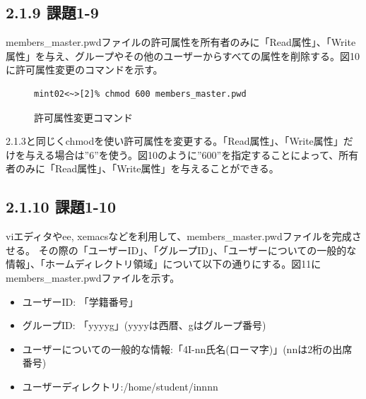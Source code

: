 \documentclass[12pt]{jreport}
\begin{document}
            \subsection*{2.1.9 課題1-9}
                members\_master.pwdファイルの許可属性を所有者のみに「Read属性」、「Write属性」を与え、グループやその他のユーザーからすべての属性を削除する。図10に許可属性変更のコマンドを示す。
                \begin{figure}[H]
                    \begin{center}
                        \begin{screen}
                            \begin{verbatim}
mint02<~>[2]% chmod 600 members_master.pwd
                            \end{verbatim}
                        \end{screen}
                        \caption{許可属性変更コマンド}
                        \label{10}
                    \end{center}
                \end{figure}
                2.1.3と同じくchmodを使い許可属性を変更する。「Read属性」、「Write属性」だけを与える場合は''6''を使う。図10のように''600''を指定することによって、所有者のみに「Read属性」、「Write属性」を与えることができる。

            \subsection*{2.1.10 課題1-10}
                viエディタやee, xemacsなどを利用して、members\_master.pwdファイルを完成させる。
                その際の「ユーザーID」、「グループID」、「ユーザーについての一般的な情報」、「ホームディレクトリ領域」について以下の通りにする。図11にmembers\_master.pwdファイルを示す。
                \begin{itemize}
                    \item ユーザーID: 「学籍番号」
                    \item グループID: 「yyyyg」(yyyyは西暦、gはグループ番号)
                    \item ユーザーについての一般的な情報:「4I-nn氏名(ローマ字)」(nnは2桁の出席番号)
                    \item ユーザーディレクトリ:/home/student/innnn
                \end{itemize}
\end{document}
